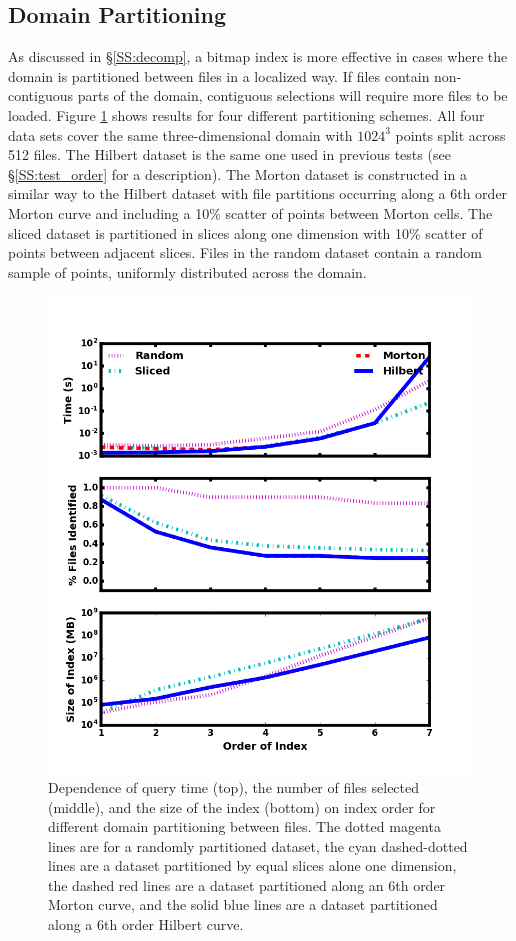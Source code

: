\documentclass[apjl]{emulateapj}
\begin{document}
\subsection{Domain Partitioning}\label{SS:test_decomp}
%
As discussed in \S\ref{SS:decomp}, a bitmap index is more effective in cases where the domain is partitioned between files in a localized way. If files contain non-contiguous parts of the domain, contiguous selections will require more files to be loaded. Figure \ref{fig:test_decomp} shows results for four different partitioning schemes. All four data sets cover the same three-dimensional domain with $1024^3$ points split across 512 files. The Hilbert dataset is the same one used in previous tests (see \S\ref{SS:test_order} for a description). The Morton dataset is constructed in a similar way to the Hilbert dataset with file partitions occurring along a 6th order Morton curve and including a 10\% scatter of points between Morton cells. The sliced dataset is partitioned in slices along one dimension with 10\% scatter of points between adjacent slices. Files in the random dataset contain a random sample of points, uniformly distributed across the domain.
%
\ifinclfig
	\begin{figure}[hbpt]
	\begin{center}
	\includegraphics[width=\columnwidth,keepaspectratio]{../images/vary_decomp_to0.png}
	\caption{Dependence of query time (top), the number of files selected (middle), and the size of the index (bottom) on index order for different domain partitioning between files. The dotted magenta lines are for a randomly partitioned dataset, the cyan dashed-dotted lines are a dataset partitioned by equal slices alone one dimension, the dashed red lines are a dataset partitioned along an 6th order Morton curve, and the solid blue lines are a dataset partitioned along a 6th order Hilbert curve.}
	\label{fig:test_decomp}
	\end{center}
	\end{figure}
\end{document}
